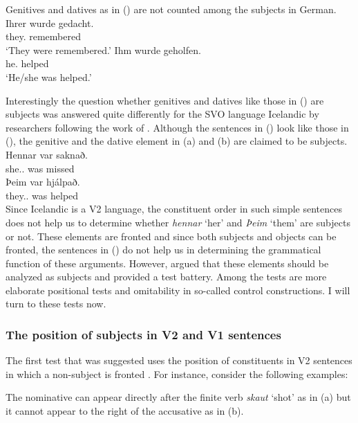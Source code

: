 Genitives and datives as in () are not counted among the subjects in German.
\eal
\ex 
\gll Ihrer       wurde gedacht.\\
     they.\GEN{} \AUX{} remembered\\\german
\glt `They were remembered.'
\ex 
\gll Ihm       wurde  geholfen.\\
     he.\DAT{} \AUX{} helped\\
\glt `He/she was helped.'
\zl

\noindent
Interestingly the question whether genitives and datives like those in () are subjects was
answered quite differently for the SVO language Icelandic by researchers following the work of
\citet*{ZMT85a}. Although the sentences in () look like those in (), the genitive and
the dative element in (a) and (b) are claimed to be subjects.
\eal
\label{ex-subject-icelandic-passive-v2}
\ex 
\gll Hennar var saknað.\\
     she.\SG.\GEN{} was missed\\\icelandic
\ex 
\gll Þeim            var hjálpað.\\
     they.\PL.\DAT{} was helped\\
\zl
Since Icelandic is a V2 language, the constituent order in such simple sentences does not help us to
determine whether \emph{hennar} `her' and \emph{Þeim} `them' are subjects or not. These elements are
fronted and since both subjects and objects can be fronted, the sentences in () do not help
us in determining the grammatical function of these arguments. However, \citet*{ZMT85a} argued that
these elements should be analyzed as subjects and provided a test battery. Among the tests are more
elaborate positional tests and omitability in so-called control constructions. I will turn to these
tests now.


\subsubsection{The position of subjects in V2 and V1 sentences}


The first test that was suggested uses the position of constituents in V2 sentences in which a
non-subject is fronted \citep*[Section~2.3]{ZMT85a}. For instance, consider the following examples:

\eal
\zl
The nominative can appear directly after the finite verb \emph{skaut} `shot' as in (a) but it
cannot appear to the right of the accusative as in (b).

